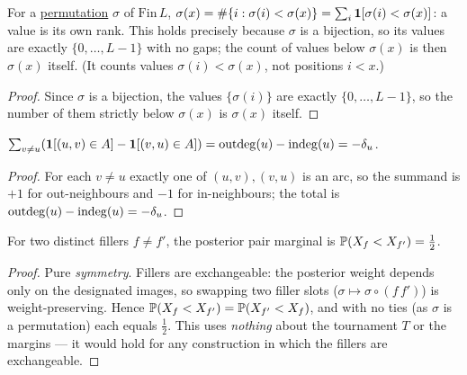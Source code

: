 \begin{lemma}
\label{lem:rank_identity}
\leanok
For a
\href{https://leanprover-community.github.io/mathlib4_docs/Mathlib/Logic/Equiv/Defs.html#Equiv.Perm}{permutation}
$\sigma$ of $\mathrm{Fin}\,L$,
$\sigma(x) = \#\{i : \sigma(i) < \sigma(x)\} = \sum_i \mathbf{1}[\sigma(i) < \sigma(x)]$:
a value is its own rank. This holds precisely because $\sigma$ is a bijection,
so its values are exactly $\{0,\dots,L-1\}$ with no gaps; the count of values
below $\sigma(x)$ is then $\sigma(x)$ itself. (It counts values
$\sigma(i)<\sigma(x)$, not positions $i<x$.)
\end{lemma}
\begin{proof}
\leanok
Since $\sigma$ is a bijection, the values $\{\sigma(i)\}$ are exactly
$\{0,\dots,L-1\}$, so the number of them strictly below $\sigma(x)$ is
$\sigma(x)$ itself.
\end{proof}

\begin{lemma}
\label{lem:degree_sum}
\leanok
{}
$\sum_{v \ne u} (\mathbf{1}[(u,v)\in A] - \mathbf{1}[(v,u)\in A]) = \operatorname{outdeg}(u) - \operatorname{indeg}(u) = -\delta_u$.
\end{lemma}
\begin{proof}
\leanok
For each $v \ne u$ exactly one of $(u,v),(v,u)$ is an arc, so the summand is
$+1$ for out-neighbours and $-1$ for in-neighbours; the total is
$\operatorname{outdeg}(u) - \operatorname{indeg}(u) = -\delta_u$.
\end{proof}

\begin{lemma}
\label{lem:filler_filler_neutral_by_symmetry}
\leanok
{}
For two distinct fillers $f \ne f'$, the posterior pair marginal is
$\mathbb{P}(X_f < X_{f'}) = \tfrac12$.
\end{lemma}
\begin{proof}
\leanok
{}
Pure \emph{symmetry}. Fillers are exchangeable: the posterior weight depends only
on the designated images, so swapping two filler slots
($\sigma \mapsto \sigma\circ(f\,f')$) is weight-preserving. Hence
$\mathbb{P}(X_f<X_{f'}) = \mathbb{P}(X_{f'}<X_f)$, and with no ties (as $\sigma$ is a
permutation) each equals $\tfrac12$. This uses \emph{nothing} about the
tournament $T$ or the margins --- it would hold for any construction in which the
fillers are exchangeable.
\end{proof}


